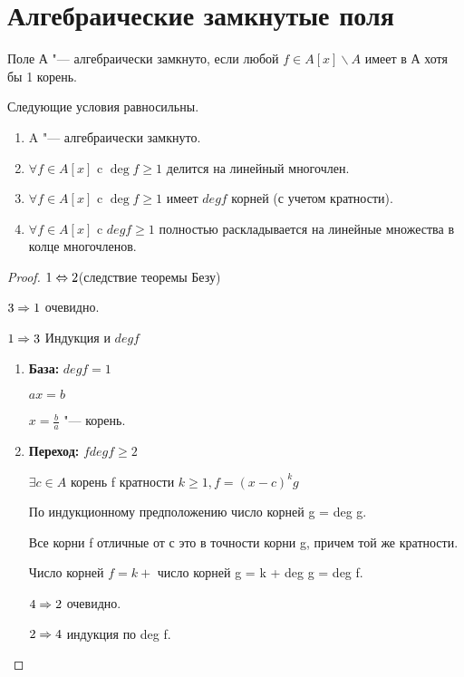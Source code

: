﻿\section{Алгебраические замкнутые поля}
\begin{Def}
Поле А "--- алгебраически замкнуто, если любой $f \in A[x] \backslash A$ имеет в А хотя бы 1 корень.
\end{Def}

\begin{theorem}{}
Следующие условия равносильны. 
\begin{enumerate}
\item A "--- алгебраически замкнуто. 
\item $\forall f \in A[x]$ c $\deg f \ge 1$ делится на линейный многочлен. 
\item $\forall f \in A[x]$ c $\deg f \ge 1$ имеет $deg f$ корней (с учетом кратности).
\item $\forall f \in A[x]$ c $deg f \ge 1$ полностью раскладывается на линейные множества в колце многочленов.
\end{enumerate}
\end{theorem}

\begin{proof}
$1 \Leftrightarrow 2$(следствие теоремы Безу)

$3 \Rightarrow 1$ очевидно.

$1 \Rightarrow 3$ Индукция и $deg f$

\begin{enumerate}
\item {\bf База:} $deg f = 1$ 

$ax = b$

$x = \frac{b}{a}$ "--- корень.
\item {\bf Переход:} $f deg f \ge 2$

$\exists c \in A$ корень f кратности $k \ge 1, f = (x - c)^{k}g$

По индукционному предположению число корней g = deg g.

Все корни f отличные от с это в точности корни g, причем той же кратности. 

Число корней $f = k + $ число корней g = k + deg g = deg f.

$4 \Rightarrow 2$ очевидно.

$2 \Rightarrow 4$ индукция по deg f.


\end{enumerate}

\end{proof}